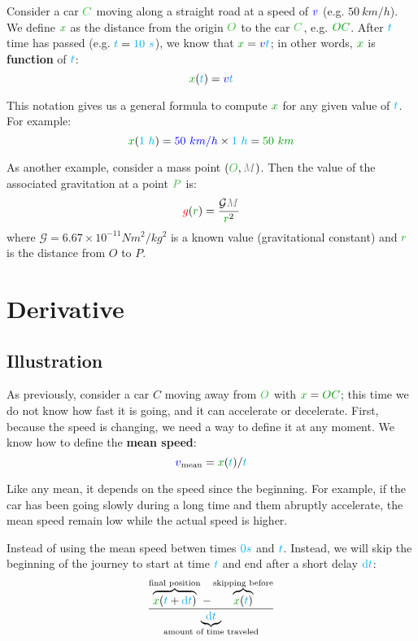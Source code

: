 Consider a car $\posit{C}$ moving along a straight road at a speed of
$\textcolor{blue}{v}$ (e.g. $50~km/h$). We define $\dist{x}$ as the distance from
the origin $\posit{O}$ to the car $\posit{C}$, e.g. $\dist{OC}$. After
$\textcolor{cyan}{t}$ time has passed (e.g. $\textcolor{cyan}{t} = \textcolor{cyan}{10~s}$), we know
that $\dist{x} = \speed{v} \delay{t}$; in other words, $\dist{x}$ is
\textbf{function} of $\textcolor{cyan}{t}$:
\[
\dist{x}(\delay{t}) = \speed{v} \delay{t}
\]

This notation gives us a general formula to compute $\dist{x}$ for any
given value of $\textcolor{cyan}{t}$. For example:
\[
\dist{x}(\delay{1~h})
= \speed{50~km/h} \times \delay{1~h}
= \dist{50~km}
\]

As another example, consider a mass point $(\posit{O}, \mass{M})$. Then
the value of the associated gravitation at a point $\posit{P}$ is:
\[
\accel{g}(\dist{r}) = \frac {\mathcal G \mass{M}} {\dist{r}^2}
\]
where $\mathcal G = 6.67 \times 10^{-11} N m^2/kg^2$ is a known value
(gravitational constant) and $\dist{r}$ is the distance from $O$ to $P$.



\section{Derivative}


\subsection{Illustration}

As previously, consider a car $C$ moving away from $\posit{O}$ with
$\dist{x} = \dist{OC}$; this time we do not know how fast it is going, and
it can accelerate or decelerate. First, because the speed is changing,
we need a way to define it at any moment. We know how to define the
\textbf{mean speed}:
\[
\speed{v}_{\mathrm{mean}} = \dist{x}(\delay{t}) / \delay{t}
\]

Like any mean, it depends on the speed since the beginning. For example,
if the car has been going slowly during a long time and them abruptly
accelerate, the mean speed remain low while the actual speed is higher.

Instead of using the mean speed betwen times $\textcolor{cyan}{0s}$ and
$\textcolor{cyan}{t}$. Instead, we will skip the beginning of the journey to start
at time $\textcolor{cyan}{t}$ and end after a short delay $\textcolor{cyan}{\mathrm{d} t}$:
\[
\frac {
	\overbrace{\dist{x}(\delay{t}+\delay{\dt})}^{\text{final position}}
	- \overbrace{\dist{x}(\delay{t})}^{\text{skipping before}}
} {\underbrace{\delay{\dt}}_{\text{amount of time traveled}}}
\]

